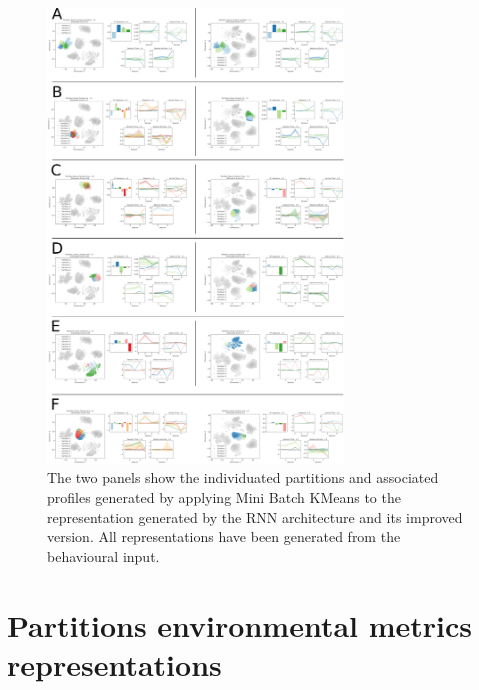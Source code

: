 \begin{figure}[ht]
\includegraphics[width=0.7\textwidth]{images/appendix_D/clust_beha_all.png}
\centering
\caption[Partitions of the representations generated by the RNN architecture and its improved version from the behavioural metrics]{The two panels show the individuated partitions and associated profiles generated by applying Mini Batch KMeans to the representation generated by the RNN architecture and its improved version. All representations have been generated from the behavioural input.}
\label{partition_rnn_behaviour} 
\end{figure}
\FloatBarrier

\section{Partitions environmental metrics representations}
\label{partitions_environmental}

